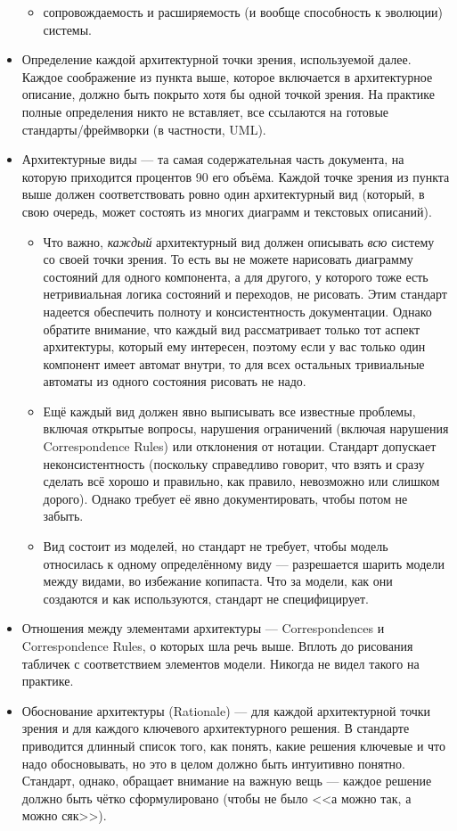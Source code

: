 \documentclass[a5paper]{article}
\begin{document}
\begin{itemize}
\begin{itemize}
            \item сопровождаемость и расширяемость (и вообще способность к эволюции) системы.
        \end{itemize}
    \item Определение каждой архитектурной точки зрения, используемой далее. Каждое соображение из пункта выше, которое включается в архитектурное описание, должно быть покрыто хотя бы одной точкой зрения. На практике полные определения никто не вставляет, все ссылаются на готовые стандарты/фреймворки (в частности, UML).
    \item Архитектурные виды --- та самая содержательная часть документа, на которую приходится процентов 90 его объёма. Каждой точке зрения из пункта выше должен соответствовать ровно один архитектурный вид (который, в свою очередь, может состоять из многих диаграмм и текстовых описаний).
        \begin{itemize}
            \item Что важно, \emph{каждый} архитектурный вид должен описывать \emph{всю} систему со своей точки зрения. То есть вы не можете нарисовать диаграмму состояний для одного компонента, а для другого, у которого тоже есть нетривиальная логика состояний и переходов, не рисовать. Этим стандарт надеется обеспечить полноту и консистентность документации. Однако обратите внимание, что каждый вид рассматривает только тот аспект архитектуры, который ему интересен, поэтому если у вас только один компонент имеет автомат внутри, то для всех остальных тривиальные автоматы из одного состояния рисовать не надо.
            \item Ещё каждый вид должен явно выписывать все известные проблемы, включая открытые вопросы, нарушения ограничений (включая нарушения Correspondence Rules) или отклонения от нотации. Стандарт допускает неконсистентность (поскольку справедливо говорит, что взять и сразу сделать всё хорошо и правильно, как правило, невозможно или слишком дорого). Однако требует её явно документировать, чтобы потом не забыть.
            \item Вид состоит из моделей, но стандарт не требует, чтобы модель относилась к одному определённому виду --- разрешается шарить модели между видами, во избежание копипаста. Что за модели, как они создаются и как используются, стандарт не специфицирует.
        \end{itemize}
    \item Отношения между элементами архитектуры --- Correspondences и Correspondence Rules, о которых шла речь выше. Вплоть до рисования табличек с соответствием элементов модели. Никогда не видел такого на практике.
    \item Обоснование архитектуры (Rationale) --- для каждой архитектурной точки зрения и для каждого ключевого архитектурного решения. В стандарте приводится длинный список того, как понять, какие решения ключевые и что надо обосновывать, но это в целом должно быть интуитивно понятно. Стандарт, однако, обращает внимание на важную вещь --- каждое решение должно быть чётко сформулировано (чтобы не было <<а можно так, а можно сяк>>).
    

\end{itemize}
\end{document}
